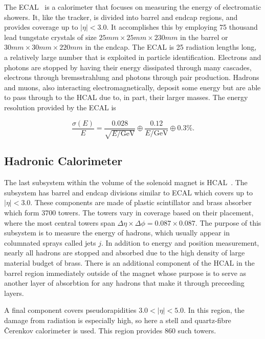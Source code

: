The ECAL~\cite{ecaltdr} is a calorimeter that focuses on measuring the energy of electromatic showers.
It, like the tracker, is divided into barrel and endcap regions, and provides coverage up to
$|\eta| < 3.0$.
It accomplishes this by employing 75 thousand lead tungstate crystals of size
$25 mm \times 25 mm \times 230 mm$ in the barrel or $30 mm \times 30 mm \times 220 mm$ in the endcap.
The ECAL is 25 radiation lengths long, a relatively large number that is exploited in
particle identification. Electrons and photons are stopped by having their energy dissipated
through many cascades, electrons through bremsstrahlung and photons through pair production.
Hadrons and muons, also interacting electromagnetically, deposit some energy
but are able to pass through to the HCAL due to, in part, their larger masses. The energy resolution
provided by the ECAL is

\begin{equation}
\frac{\sigma(E)}{E} = \frac{0.028}{\sqrt{E/\textrm{GeV}}} \oplus \frac{0.12}{E/\textrm{GeV}} \oplus 0.3\% .
\end{equation}

\subsection{Hadronic Calorimeter\label{subsec:hcal}}

The last subsystem within the volume of the solenoid magnet is HCAL~\cite{hcaltdr}.
The subsystem has barrel and endcap divisions similar to ECAL which covers up to $|\eta| < 3.0$.
These components are made of plastic scintillator and brass absorber which form 3700 towers. The
towers vary in coverage based on their placement, where the most central towers span
$\Delta\eta \times \Delta\phi = 0.087 \times 0.087$. The purpose of this subsystem is to
measure the energy of hadrons, which usually appear in columnated sprays called jets $j$. In addition
to energy and position measurement, nearly all hadrons are stopped and absorbed due to the
high density of large material budget of brass. There is an additional component of the HCAL
in the barrel region immediately outside of the magnet whose purpose is to serve as another
layer of absorbtion for any hadrons that make it through preceeding layers.

A final component covers pseudorapidities $3.0 < |\eta|< 5.0$. In this region, the damage from
radiation is especially high, so here a stell and quartz-fibre \v{C}erenkov calorimeter is used.
This region provides 860 such towers.

